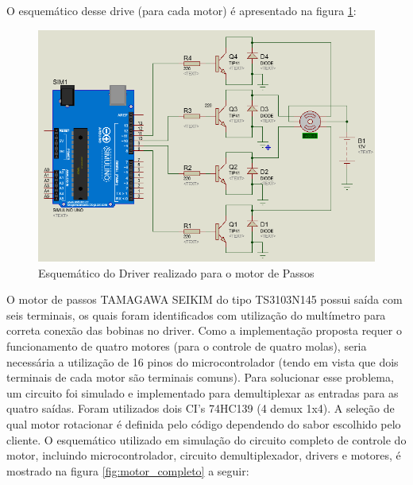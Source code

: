 \newpage
O esquemático desse drive (para cada motor) é apresentado na figura \ref{fig:motor1}:

\begin{figure}[H]
\centering
\includegraphics[width=\textwidth]{figuras/motor1}
 \caption{Esquemático do Driver realizado para o motor de Passos}
\label{fig:motor1}
\end{figure}

O motor de passos TAMAGAWA SEIKIM do tipo TS3103N145 possui saída com seis terminais, os quais foram identificados com utilização do multímetro para correta conexão das bobinas no driver. Como a implementação proposta requer o funcionamento de quatro motores (para o controle de quatro molas), seria necessária a utilização de 16 pinos do microcontrolador (tendo em vista que dois terminais de cada motor são terminais comuns). Para solucionar esse problema, um circuito foi simulado e implementado para demultiplexar as entradas para as quatro saídas. Foram utilizados dois CI's 74HC139 (4 demux 1x4). A seleção de qual motor rotacionar é definida pelo código dependendo do sabor escolhido pelo cliente.
\newpage
O esquemático utilizado em simulação do circuito completo de controle do motor, incluindo microcontrolador, circuito demultiplexador, drivers e motores, é mostrado na figura \ref{fig:motor_completo} a seguir:

